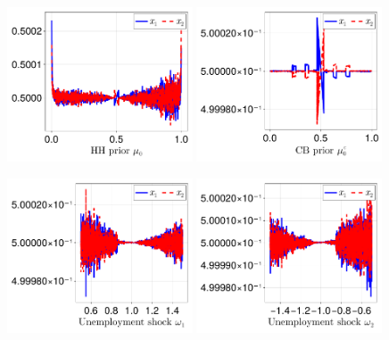 \documentclass[12pt,a4paper]{article}
\begin{document}
\begin{figure}[h!]
\centering
\includegraphics[width=0.49\textwidth]{figures/V9/γ_10/fig_optimal_x_μ_0.pdf}
\includegraphics[width=0.49\textwidth]{figures/V9/γ_10/fig_optimal_x_μ_0_c.pdf}
\end{figure}

\begin{figure}[h!]
\centering
\includegraphics[width=0.49\textwidth]{figures/V9/γ_10/fig_optimal_x_ω_1.pdf}
\includegraphics[width=0.49\textwidth]{figures/V9/γ_10/fig_optimal_x_ω_2.pdf}
\end{figure}
\end{document}
